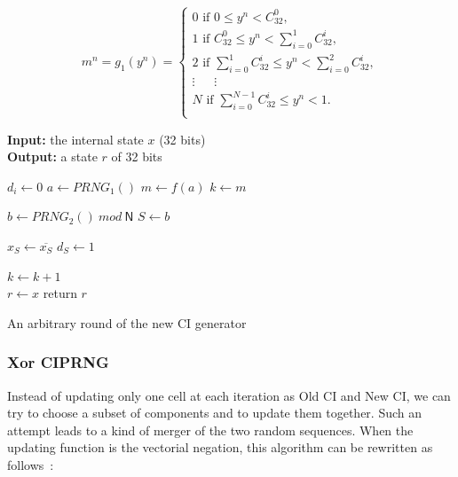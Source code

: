 \documentclass[10pt, conference, compsocconf]{IEEEtran}
\begin{document}
\begin{equation}
\label{Formula}
m^n = g_1(y^n)=
\left\{
\begin{array}{l}
0 \text{ if }0 \leqslant{y^n}<{C^0_{32}},\\
1 \text{ if }{C^0_{32}} \leqslant{y^n}<\sum_{i=0}^1{C^i_{32}},\\
2 \text{ if }\sum_{i=0}^1{C^i_{32}} \leqslant{y^n}<\sum_{i=0}^2{C^i_{32}},\\
\vdots~~~~~ ~~\vdots~~~ ~~~~\\
N \text{ if }\sum_{i=0}^{N-1}{C^i_{32}}\leqslant{y^n}<1.\\
\end{array}
\right.
\end{equation}

\begin{algorithm}
\textbf{Input:} the internal state $x$ (32 bits)\\
\textbf{Output:} a state $r$ of 32 bits
\begin{algorithmic}[1]
{
\STATE$d_i\leftarrow{0}$\;
}
\ENDFOR
\STATE$a\leftarrow{PRNG_1()}$\;
\STATE$m\leftarrow{f(a)}$\;
\STATE$k\leftarrow{m}$\;

\STATE$b\leftarrow{PRNG_2()~mod~\mathsf{N}}$\;
\STATE$S\leftarrow{b}$\;
    {
\STATE      $x_S\leftarrow{ \overline{x_S}}$\;
\STATE      $d_S\leftarrow{1}$\;

    }
    {
\STATE      $k\leftarrow{ k+1}$\;
    }\ENDIF
\ENDWHILE\\
\STATE $r\leftarrow{x}$\;
\STATE return $r$\;
\medskip
\caption{An arbitrary round of the new CI generator}
\label{Chaotic iteration1}
\end{algorithmic}
\end{algorithm}


\subsubsection{Xor CIPRNG}

Instead of updating only one cell at each iteration as Old CI and New CI, we can try to choose a
subset of components and to update them together. Such an attempt leads
to a kind of merger of the two random sequences. When the updating function is the vectorial negation,
this algorithm can be rewritten as follows~\cite{arxivRCCGPCH}:
\end{document}
